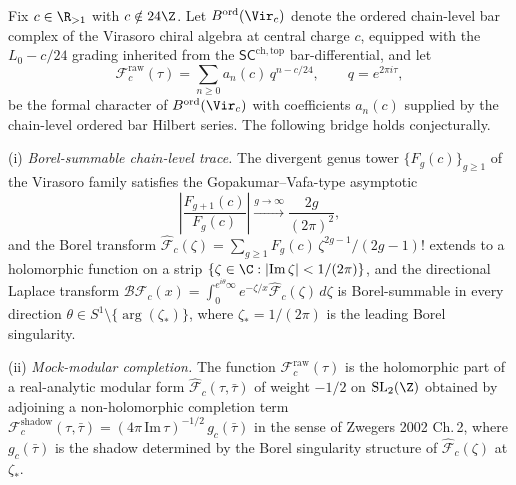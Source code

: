 \begin{conjecture}
\label{conj:3dg-off-koszul-bridge}
%
Fix $c \in \R_{> 1}$ with $c \notin 24\Z$. Let $B^{\mathrm{ord}}(\Vir_{c})$
denote the ordered chain-level bar complex of the Virasoro chiral
algebra at central charge $c$, equipped with the $L_{0} - c/24$
grading inherited from the $\mathsf{SC}^{\mathrm{ch,top}}$
bar-differential, and let
\begin{equation}
\label{eq:3dg-F-raw-chain-level}
\mathcal F^{\mathrm{raw}}_{c}(\tau)
= \sum_{n \ge 0} a_{n}(c)\, q^{n - c/24},
\qquad
q = e^{2\pi i \tau},
\end{equation}
be the formal character of $B^{\mathrm{ord}}(\Vir_{c})$ with
coefficients $a_{n}(c)$ supplied by the chain-level ordered bar
Hilbert series. The following bridge holds conjecturally.

\textup{(i)} \emph{Borel-summable chain-level trace.} The divergent
genus tower $\{F_{g}(c)\}_{g \ge 1}$ of the Virasoro family satisfies
the Gopakumar--Vafa-type asymptotic
\begin{equation}
\label{eq:3dg-Fg-ratio-asymptotic}
\left|\frac{F_{g+1}(c)}{F_{g}(c)}\right|
\xrightarrow{g \to \infty}
\frac{2 g}{(2\pi)^{2}},
\end{equation}
and the Borel transform
$\widehat{\mathcal F}_{c}(\zeta)
= \sum_{g \ge 1} F_{g}(c)\,\zeta^{2g - 1}/(2g - 1)!$
extends to a holomorphic function on a strip
$\{\zeta \in \C : |\mathrm{Im}\,\zeta| < 1/(2\pi)\}$, and the
directional Laplace transform
$\mathcal B \mathcal F_{c}(x)
= \int_{0}^{e^{i\theta}\infty} e^{-\zeta/x}\widehat{\mathcal F}_{c}(\zeta)\,d\zeta$
is Borel-summable in every direction
$\theta \in S^{1} \setminus \{\arg(\zeta_{\ast})\}$, where
$\zeta_{\ast} = 1/(2\pi)$ is the leading Borel singularity.

\textup{(ii)} \emph{Mock-modular completion.} The function
$\mathcal F^{\mathrm{raw}}_{c}(\tau)$ is the holomorphic part of a
real-analytic modular form
$\widehat{\mathcal F}_{c}(\tau,\bar\tau)$ of weight $-1/2$ on
$\mathrm{SL}_{2}(\Z)$ obtained by adjoining a non-holomorphic
completion term
$\mathcal F^{\mathrm{shadow}}_{c}(\tau,\bar\tau)
= (4\pi\,\mathrm{Im}\,\tau)^{-1/2}\,g_{c}(\bar\tau)$
in the sense of Zwegers 2002 Ch.\,2, where $g_{c}(\bar\tau)$ is the
shadow determined by the Borel singularity structure of
$\widehat{\mathcal F}_{c}(\zeta)$ at $\zeta_{\ast}$.


\end{conjecture}
